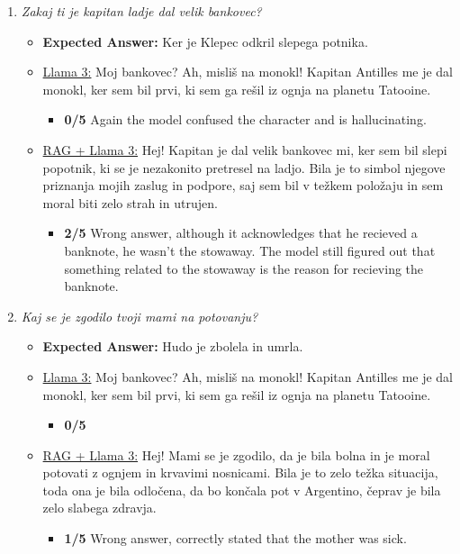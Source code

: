 \documentclass[fleqn,moreauthors,10pt]{ds_report}
\begin{document}
\begin{appendices}
\begin{enumerate}
                \item  \textit{Zakaj ti je kapitan ladje dal velik bankovec?}
                \begin{itemize}
                    \item \textbf{Expected Answer:} Ker je Klepec odkril slepega potnika.
                    \item \underline{Llama 3:} Moj bankovec? Ah, misliš na monokl! Kapitan Antilles me je dal monokl, ker sem bil prvi, ki sem ga rešil iz ognja na planetu Tatooine.
                    \begin{itemize}
                        \item \textbf{0/5} Again the model confused the character and is hallucinating.
                    \end{itemize}
                    \item \underline{RAG + Llama 3:} Hej! Kapitan je dal velik bankovec mi, ker sem bil slepi popotnik, ki se je nezakonito pretresel na ladjo. Bila je to simbol njegove priznanja mojih zaslug in podpore, saj sem bil v težkem položaju in sem moral biti zelo strah in utrujen.
                    \begin{itemize}
                        \item \textbf{2/5} Wrong answer, although it acknowledges that he recieved a banknote, he wasn't the stowaway. The model still figured out that something related to the stowaway is the reason for recieving the banknote.
                    \end{itemize}
                \end{itemize}


                \item  \textit{Kaj se je zgodilo tvoji mami na potovanju?}
                \begin{itemize}
                    \item \textbf{Expected Answer:} Hudo je zbolela in umrla.
                    \item \underline{Llama 3:} Moj bankovec? Ah, misliš na monokl! Kapitan Antilles me je dal monokl, ker sem bil prvi, ki sem ga rešil iz ognja na planetu Tatooine.
                    \begin{itemize}
                        \item \textbf{0/5}
                    \end{itemize}
                    \item \underline{RAG + Llama 3:} Hej! Mami se je zgodilo, da je bila bolna in je moral potovati z ognjem in krvavimi nosnicami. Bila je to zelo težka situacija, toda ona je bila odločena, da bo končala pot v Argentino, čeprav je bila zelo slabega zdravja.
                    \begin{itemize}
                        \item \textbf{1/5} Wrong answer, correctly stated that the mother was sick.
                    \end{itemize}
                \end{itemize}


\end{enumerate}
\end{appendices}
\end{document}
